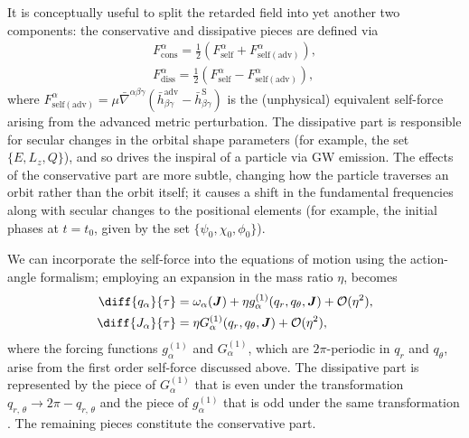 It is conceptually useful to split the retarded field into yet another two components: the conservative and dissipative pieces are defined via
\begin{subequations}\begin{align}
F^\alpha_\mathrm{cons} = \frac1{2}\left(F^\alpha_\mathrm{self} + F^\alpha_\mathrm{self(adv)}\right),\\
F^\alpha_\mathrm{diss} = \frac1{2}\left(F^\alpha_\mathrm{self} - F^\alpha_\mathrm{self(adv)}\right),
\end{align}\end{subequations}
where $F^\alpha_\mathrm{self(adv)} = \mu \bar{\nabla}^{\alpha\beta\gamma}( \bar{h}_{\beta\gamma}^{\mathrm{adv}} - \bar{h}_{\beta\gamma}^{\mathrm{S}})$ is the (unphysical) equivalent self-force arising from the advanced metric perturbation. The dissipative part is responsible for secular changes in the orbital shape parameters (for example, the set $\{E,L_z,Q\}$), and so drives the inspiral of a particle via GW emission. The effects of the conservative part are more subtle, changing how the particle traverses an orbit rather than the orbit itself; it causes a shift in the fundamental frequencies along with secular changes to the positional elements (for example, the initial phases at $t=t_0$, given by the set $\{\psi_0,\chi_0,\phi_0\}$).

We can incorporate the self-force into the equations of motion using the action-angle formalism; employing an expansion in the mass ratio $\eta$,  becomes
\begin{subequations}
\label{eq:EMRI-AAsf}
\begin{align}
\diff{q_\alpha}{\tau} &= \omega_\alpha(\boldsymbol{J}) + \eta g_\alpha^{(1)}(q_r,q_\theta,\boldsymbol{J}) + \mathcal{O}(\eta^2),\\
\diff{J_\alpha}{\tau} &= \eta G_\alpha^{(1)}(q_r,q_\theta,\boldsymbol{J}) + \mathcal{O}(\eta^2),
\end{align}
\end{subequations}
where the forcing functions $g_\alpha^{(1)}$ and $G_\alpha^{(1)}$, which are $2\pi$-periodic in $q_r$ and $q_\theta$, arise from the first order self-force discussed above. The dissipative part is represented by the piece of $G_\alpha^{(1)}$ that is even under the transformation $q_{r,\,\theta}\rightarrow 2\pi-q_{r,\,\theta}$ and the piece of $g_\alpha^{(1)}$ that is odd under the same transformation \citep{hinderer_two-timescale_2008}. The remaining pieces constitute the conservative part.


